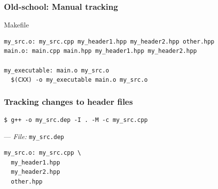 \documentclass[aspectratio=169]{beamer}
\newif\iftransitions
\newcommand{\cpause}{\iftransitions \pause \fi}
\begin{document}
\begin{frame}[fragile]
  \frametitle{Old-school: Manual tracking}
  
  Makefile
  \begin{lstlisting}
my_src.o: my_src.cpp my_header1.hpp my_header2.hpp other.hpp
main.o: main.cpp main.hpp my_header1.hpp my_header2.hpp

my_executable: main.o my_src.o
  $(CXX) -o my_executable main.o my_src.o
  \end{lstlisting}
  
\end{frame}

\begin{frame}[fragile]
  \frametitle{Tracking changes to header files}

  \begin{lstlisting}
$ g++ -o my_src.dep -I . -M -c my_src.cpp
  \end{lstlisting}

  \cpause

  --- \textit{File:} \texttt{my\_src.dep}
  \begin{lstlisting}
my_src.o: my_src.cpp \
  my_header1.hpp
  my_header2.hpp
  other.hpp
  \end{lstlisting}

\end{frame}
\end{document}
